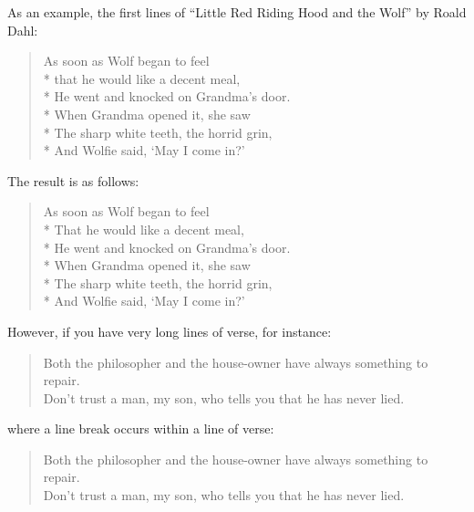     \begin{Example}
      As an example, the first lines of ``Little Red Riding Hood and the
      Wolf'' by Roald Dahl:
\begin{lstcode}
  \begin{verse}
    As soon as Wolf began to feel\\*
    that he would like a decent meal,\\*
    He went and knocked on Grandma's door.\\*
    When Grandma opened it, she saw\\*
    The sharp white teeth, the horrid grin,\\*
    And Wolfie said, `May I come in?'
  \end{verse}
\end{lstcode}
      The result is as follows:
      \begin{ShowOutput}
        \begin{verse}
          As soon as Wolf began to feel\\*
          That he would like a decent meal,\\*
          He went and knocked on Grandma's door.\\*
          When Grandma opened it, she saw\\*
          The sharp white teeth, the horrid grin,\\*
          And Wolfie said, `May I come in?'
        \end{verse}
      \end{ShowOutput}
      However, if you have very long lines of verse, for instance:
\begin{lstcode}
  \begin{verse}
    Both the philosopher and the house-owner
    have always something to repair.\\
    \bigskip
    Don't trust a man, my son, who tells you
    that he has never lied.
  \end{verse}
\end{lstcode}
      where a line break occurs within a line of verse:
      \begin{ShowOutput}
        \begin{verse}
          Both the philosopher and the house-owner
          have always something to repair.\\
          \bigskip
          Don't trust a man, my son, who tells you
          that he has never lied.
        \end{verse}

\end{ShowOutput}
\end{Example}
